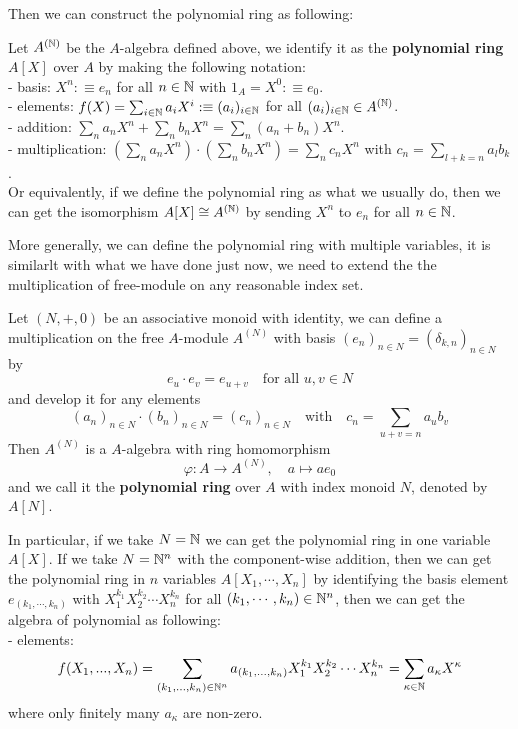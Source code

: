 \documentclass[12pt,a4paper]{article}
\begin{document}
    Then we can construct the polynomial ring as following:
    \begin{definition}
        Let \(A^{(\mathbb{N})}\) be the \(A\)-algebra defined above, we identify it as the \textbf{polynomial ring} \(A[X]\) over \(A\) by making the following notation:\\
        - basis: \(X^n :\equiv e_n\) for all \(n \in \mathbb{N}\) with \(1_A = X^0 :\equiv e_0\).\\
        - elements: \( f(X) = \sum_{i \in \mathbb{N}} a_i X^i :\equiv (a_i)_{i \in \mathbb{N}} \) for all \((a_i)_{i \in \mathbb{N}} \in A^{(\mathbb{N})}\).\\
        - addition: \(\sum_n a_nX^n +\sum_n b_nX^n = \sum_n (a_n+b_n)X^n\).\\
        - multiplication: \((\sum_n a_nX^n) \cdot (\sum_n b_nX^n) = \sum_n c_n X^n\) with \(c_n = \sum_{l+k=n} a_l b_k\).\\

        Or equivalently, if we define the polynomial ring as what we usually do, then we can get the isomorphism \(A[X] \cong A^{(\mathbb{N})}\) by sending \(X^n\) to \(e_n\) for all \(n \in \mathbb{N}\).
    \end{definition}

    More generally, we can define the polynomial ring with multiple variables, it is similarlt with what we have done just now, we need to extend the the multiplication of free-module on any reasonable index set.
    \begin{definitionplain}
        Let \((N,+,0)\) be an associative monoid with identity, we can define a multiplication on the free \(A\)-module \(A^{(N)}\) with basis \((e_n)_{n \in N} = (\delta_{k,n})_{n \in N}\) by
        \[e_u \cdot e_v = e_{u+v}\quad \text{for all } u,v \in N\]
        and develop it for any elements
        \[(a_n)_{n \in N} \cdot (b_n)_{n \in N} = (c_n)_{n \in N} \quad \text{with} \quad c_n = \sum_{u+v=n} a_u b_v\]
        Then \(A^{(N)}\) is a \(A\)-algebra with ring homomorphism 
        \[\varphi: A \to A^{(N)}, \quad a \mapsto ae_0\]
        and we call it the \textbf{polynomial ring} over \(A\) with index monoid \(N\), denoted by \(A[N]\).
    \end{definitionplain}

    In particular, if we take \(N = \mathbb{N}\) we can get the polynomial ring in one variable \(A[X]\). If we take \(N = \mathbb{N}^n\) with the component-wise addition, then we can get the polynomial ring in \(n\) variables \(A[X_1,\cdots,X_n]\) by identifying the basis element \(e_{(k_1,\cdots,k_n)}\) with \(X_1^{k_1}X_2^{k_2}\cdots X_n^{k_n}\) for all \((k_1,\cdots,k_n) \in \mathbb{N}^n\), then we can get the algebra of polynomial as following:\\
    - elements:
    \[f(X_1,...,X_n) = \sum_{(k_1,\dots,k_n) \in \mathbb{N}^n} a_{(k_1,\dots,k_n)} X_1^{k_1}X_2^{k_2}\cdots X_n^{k_n} = \sum_{\kappa \in \mathbb{N}} a_{\kappa} X^{\kappa}\]
    where only finitely many \(a_{\kappa}\) are non-zero.\\
\end{document}
